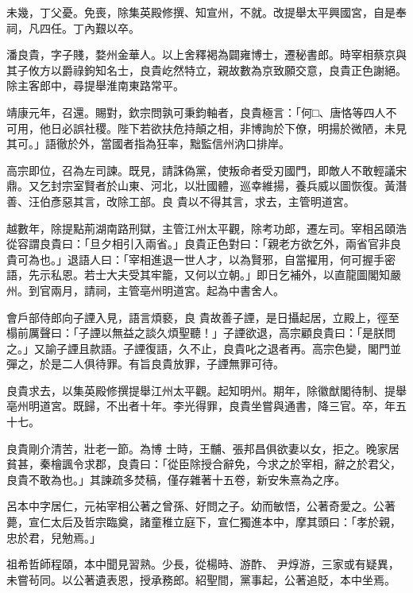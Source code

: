 \begin{pinyinscope}
 未幾，丁父憂。免喪，除集英殿修撰、知宣州，不就。改提舉太平興國宮，自是奉祠，凡四任。丁內艱以卒。



 潘良貴，字子賤，婺州金華人。以上舍釋褐為闢雍博士，遷秘書郎。時宰相蔡京與其子攸方以爵祿鉤知名士，良貴屹然特立，親故數為京致願交意，良貴正色謝絕。
 除主客郎中，尋提舉淮南東路常平。



 靖康元年，召還。賜對，欽宗問孰可秉鈞軸者，良貴極言：「何□、唐恪等四人不可用，他日必誤社稷。陛下若欲扶危持顛之相，非博詢於下僚，明揚於微陋，未見其可。」語徹於外，當國者指為狂率，黜監信州汭口排岸。



 高宗即位，召為左司諫。既見，請誅偽黨，使叛命者受刃國門，即敵人不敢輕議宋鼎。又乞封宗室賢者於山東、河北，以壯國體，巡幸維揚，養兵威以圖恢復。黃潛善、汪伯彥惡其言，改除工部。良
 貴以不得其言，求去，主管明道宮。



 越數年，除提點荊湖南路刑獄，主管江州太平觀，除考功郎，遷左司。宰相呂頤浩從容謂良貴曰：「旦夕相引入兩省。」良貴正色對曰：「親老方欲乞外，兩省官非良貴可為也。」退語人曰：「宰相進退一世人才，以為賢邪，自當擢用，何可握手密語，先示私恩。若士大夫受其牢籠，又何以立朝。」即日乞補外，以直龍圖閣知嚴州。到官兩月，請祠，主管亳州明道宮。起為中書舍人。



 會戶部侍郎向子諲入見，語言煩褻，良
 貴故善子諲，是日攝起居，立殿上，徑至榻前厲聲曰：「子諲以無益之談久煩聖聽！」子諲欲退，高宗顧良貴曰：「是朕問之。」又諭子諲且款語。子諲復語，久不止，良貴叱之退者再。高宗色變，閣門並彈之，於是二人俱待罪。有旨良貴放罪，子諲無罪可待。



 良貴求去，以集英殿修撰提舉江州太平觀。起知明州。期年，除徽猷閣待制、提舉亳州明道宮。既歸，不出者十年。李光得罪，良貴坐嘗與通書，降三官。卒，年五十七。



 良貴剛介清苦，壯老一節。為博
 士時，王黼、張邦昌俱欲妻以女，拒之。晚家居貧甚，秦檜諷令求郡，良貴曰：「從臣除授合辭免，今求之於宰相，辭之於君父，良貴不敢為也。」其諫疏多焚稿，僅存雜著十五卷，新安朱熹為之序。



 呂本中字居仁，元祐宰相公著之曾孫、好問之子。幼而敏悟，公著奇愛之。公著薨，宣仁太后及哲宗臨奠，諸童稚立庭下，宣仁獨進本中，摩其頭曰：「孝於親，忠於君，兒勉焉。」



 祖希哲師程頤，本中聞見習熟。少長，從楊時、游酢、
 尹焞游，三家或有疑異，未嘗茍同。以公著遺表恩，授承務郎。紹聖間，黨事起，公著追貶，本中坐焉。




\end{pinyinscope}
